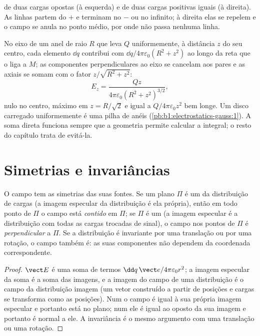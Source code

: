 \begin{omfigure}
{\small {} de duas cargas opostas (à esquerda) e de duas
cargas positivas iguais (à direita). As linhas partem do $+$ e terminam no
$-$ ou no infinito; à direita elas se repelem e o campo se anula no
ponto médio, por onde não passa nenhuma linha.}
\end{omfigure}

\begin{example}\label{ex:b1:electrostatics-gauss:ring}
No eixo de um anel de raio $R$ que leva $Q$ uniformemente, à distância
$z$ do seu centro, cada elemento $\dd q$ contribui com $\dd q/4\pi\varepsilon_0(R^2 +
z^2)$ ao longo da reta que o liga a $M$; as componentes perpendiculares
ao eixo se cancelam aos pares e as axiais se somam com o fator
$z/\sqrt{R^2 + z^2}$:
\[
E_z = \frac{Qz}{4\pi\varepsilon_0(R^2 + z^2)^{3/2}} ,
\]
nulo no centro, máximo em $z = R/\sqrt2$ e igual a $Q/4\pi\varepsilon_0z^2$ bem
longe. Um disco carregado uniformemente é uma pilha de anéis (\cref{pb:b1:electrostatics-gauss:1}).
A soma direta funciona sempre que a geometria permite calcular a integral; o
resto do capítulo trata de evitá-la.
\end{example}

\section{Simetrias e invariâncias}

\begin{proposition}\label{prop:b1:electrostatics-gauss:symmetry}
O campo tem as simetrias das suas fontes. Se um plano $\Pi$ é um
\emph{} da distribuição de cargas (a imagem especular
da distribuição é ela própria), então em todo ponto de $\Pi$ o campo
está \emph{contido} em $\Pi$; se $\Pi$ é um \emph{}
(a imagem especular é a distribuição com todas as cargas trocadas de sinal), o
campo nos pontos de $\Pi$ é \emph{perpendicular} a $\Pi$. Se a
distribuição é invariante por uma translação ou por uma rotação, o campo
também é: as suas componentes não dependem da coordenada correspondente.
\end{proposition}

\begin{proof}
$\vect E$ é uma soma de termos $\dd q\,\vect e/4\pi\varepsilon_0r^2$; a imagem
especular da soma é a soma das imagens, e a imagem do campo
de uma distribuição é o campo da distribuição imagem (um vetor
construído a partir de posições e cargas se transforma como as posições). Num
 o campo é igual à sua própria imagem especular e portanto está no
plano; num  ele é igual ao oposto da sua imagem e
portanto é normal a ele. A invariância é o mesmo argumento com uma
translação ou uma rotação.
\end{proof}

